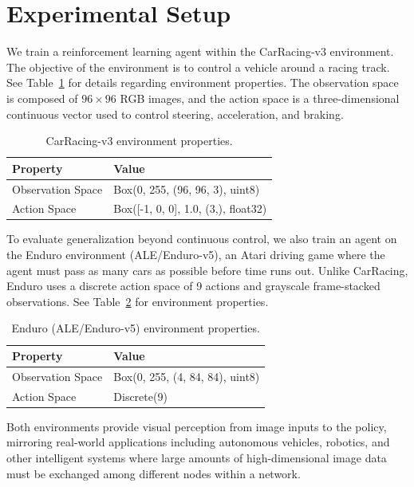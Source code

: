\section{Experimental Setup}

We train a reinforcement learning agent within the CarRacing-v3 environment. The objective of the environment is to control a vehicle around a racing track. See Table~\ref{tab:env-properties} for details regarding environment properties. The observation space is composed of $96 \times 96$ RGB images, and the action space is a three-dimensional continuous vector used to control steering, acceleration, and braking.

\begin{table}[htbp]
\centering
\caption{CarRacing-v3 environment properties.}
\label{tab:env-properties}
\begin{tabular}{ll}
\toprule
\textbf{Property} & \textbf{Value} \\
\midrule
Observation Space & Box(0, 255, (96, 96, 3), uint8) \\
Action Space & Box([-1, 0, 0], 1.0, (3,), float32) \\
\bottomrule
\end{tabular}
\end{table}

To evaluate generalization beyond continuous control, we also train an agent on the Enduro environment (ALE/Enduro-v5), an Atari driving game where the agent must pass as many cars as possible before time runs out. Unlike CarRacing, Enduro uses a discrete action space of 9 actions and grayscale frame-stacked observations. See Table~\ref{tab:enduro-env-properties} for environment properties.
\begin{table}[htbp]
\centering
\caption{Enduro (ALE/Enduro-v5) environment properties.}
\label{tab:enduro-env-properties}
\begin{tabular}{ll}
\toprule
\textbf{Property} & \textbf{Value} \\
\midrule
Observation Space & Box(0, 255, (4, 84, 84), uint8) \\
Action Space & Discrete(9) \\
\bottomrule
\end{tabular}
\end{table}

Both environments provide visual perception from image inputs to the policy, mirroring real-world applications including autonomous vehicles, robotics, and other intelligent systems where large amounts of high-dimensional image data must be exchanged among different nodes within a network.

